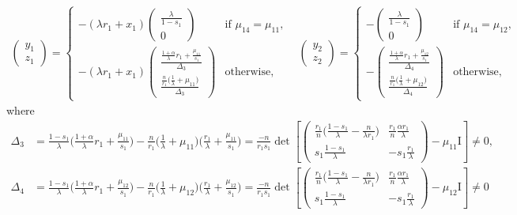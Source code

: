 \documentclass[a4paper,11pt]{article}
\theoremstyle{remark}
\begin{document}
\begin{equation} \label{eq:S1-1}
\begin{aligned}
\begin{pmatrix}
 y_1\\z_1
\end{pmatrix}
=\begin{cases}
  -(\lambda r_1 + x_1)\begin{pmatrix}
  \frac{\lambda}{1-s_1}\\0
  \end{pmatrix} & \text{if $\mu_{14}=\mu_{11}$,}\\
  -(\lambda r_1 + x_1)
  \begin{pmatrix}
  \frac{ \frac{1+\alpha}{\lambda}r_1 + \frac{\mu_{11}}{s_1} }{ \Delta_3 }\\
  \frac{ \frac{n}{r_1}\big(\frac{1}{\lambda} + \mu_{11}\big) }{ \Delta_3 }
  \end{pmatrix} & \text{otherwise,}
 \end{cases}
 \quad
 \begin{pmatrix}
 y_2\\z_2
\end{pmatrix}
=\begin{cases}
 -\begin{pmatrix}
  \frac{\lambda}{1-s_1}\\0
  \end{pmatrix} & \text{if $\mu_{14}=\mu_{12}$,}\\
  -\begin{pmatrix}
  \frac{ \frac{1+\alpha}{\lambda}r_1 + \frac{\mu_{12}}{s_1} }{ \Delta_4 }\\
  \frac{ \frac{n}{r_1}\big(\frac{1}{\lambda} + \mu_{12}\big) }{ \Delta_4 }
  \end{pmatrix} & \text{otherwise,}
 \end{cases}
\end{aligned}
\end{equation}
where
\begin{align*}
 \Delta_3 &= \frac{1-s_1}{\lambda}\big(\frac{1+\alpha}{\lambda}r_1 + \frac{\mu_{11}}{s_1}\big) -\frac{n}{r_1} \big( \frac{1}{\lambda} + \mu_{11}\big)\big(\frac{r_1}{\lambda} + \frac{\mu_{11}}{s_1}\big)=\frac{-n}{r_1s_1}\det \left[\begin{pmatrix} \frac{r_1}{n}\big(\frac{1-s_1}{\lambda}-\frac{n}{\lambda r_1}\big) & \frac{r_1}{n}\frac{\alpha r_1}{\lambda}\\ s_1\frac{1-s_1}{\lambda} & -s_1\frac{r_1}{\lambda} \end{pmatrix} -\mu_{11}\textrm{I}\right]\ne0,\\
 \Delta_4 &= \frac{1-s_1}{\lambda}\big(\frac{1+\alpha}{\lambda}r_1 + \frac{\mu_{12}}{s_1}\big) -\frac{n}{r_1} \big( \frac{1}{\lambda} + \mu_{12}\big)\big(\frac{r_1}{\lambda} + \frac{\mu_{12}}{s_1}\big)=\frac{-n}{r_1s_1}\det \left[\begin{pmatrix} \frac{r_1}{n}\big(\frac{1-s_1}{\lambda}-\frac{n}{\lambda r_1}\big) & \frac{r_1}{n}\frac{\alpha r_1}{\lambda}\\ s_1\frac{1-s_1}{\lambda} & -s_1\frac{r_1}{\lambda} \end{pmatrix} -\mu_{12}\textrm{I}\right]\ne0
\end{align*}
\end{document}
